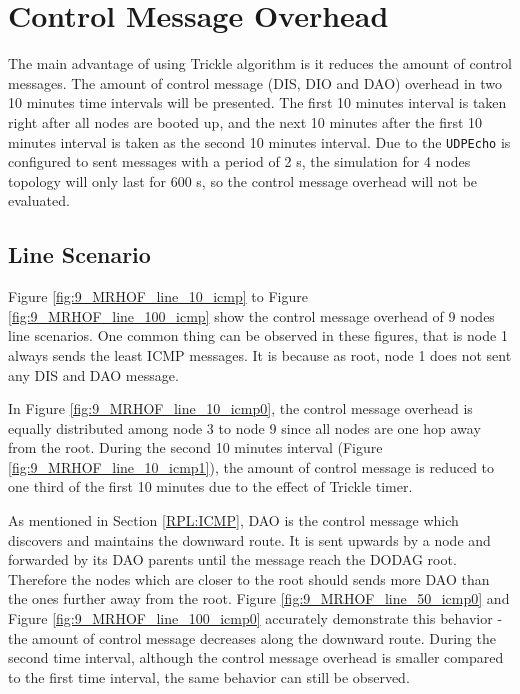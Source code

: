\section{Control Message Overhead}
\label{ICMP}
The main advantage of using Trickle algorithm is it reduces the amount of control messages. The amount of control message (DIS, DIO and DAO) overhead in two 10 minutes time intervals will be presented. The first 10 minutes interval is taken right after all nodes are booted up, and the next 10 minutes after the first 10 minutes interval is taken as the second 10 minutes interval. Due to the \texttt{UDPEcho} is configured to sent messages with a period of 2 s, the simulation for 4 nodes topology will only last for 600 s, so the control message overhead will not be evaluated. 

\subsection{Line Scenario}
\label{icmp:line}
Figure \ref{fig:9_MRHOF_line_10_icmp} to Figure \ref{fig:9_MRHOF_line_100_icmp} show the control message overhead  of 9 nodes line scenarios. One common thing can be observed in these figures, that is node 1 always sends the least ICMP messages. It is because as root, node 1 does not sent any DIS and DAO message.
\newline

In Figure \ref{fig:9_MRHOF_line_10_icmp0}, the control message overhead is equally distributed among node 3 to node 9 since all nodes are one hop away from the root. During the second 10 minutes interval (Figure \ref{fig:9_MRHOF_line_10_icmp1}), the amount of control message is reduced to one third of the first 10 minutes due to the effect of Trickle timer.
\newline

As mentioned in Section \ref{RPL:ICMP}, DAO is the control message which discovers and maintains the downward  route. It is sent upwards by a node and forwarded by its DAO parents until the message reach the DODAG root. Therefore the nodes which are closer to the root should sends more DAO than the ones further away from the root. Figure \ref{fig:9_MRHOF_line_50_icmp0} and Figure \ref{fig:9_MRHOF_line_100_icmp0} accurately demonstrate this behavior - the amount of control message decreases along the downward route. During the second time interval, although the control message overhead is smaller compared to the first time interval, the same behavior can still be observed. 
\newline 

